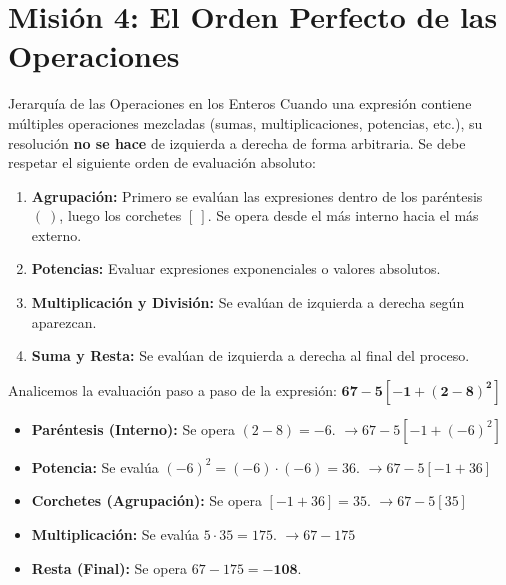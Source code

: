 \documentclass[12pt, letterpaper]{article}
\begin{document}
	\section*{Misión 4: El Orden Perfecto de las Operaciones}
	
	\begin{concepto}{Jerarquía de las Operaciones en los Enteros}
		Cuando una expresión contiene múltiples operaciones mezcladas (sumas, multiplicaciones, potencias, etc.), su resolución \textbf{no se hace} de izquierda a derecha de forma arbitraria. Se debe respetar el siguiente orden de evaluación absoluto:
		
		\begin{enumerate}
			\item \textbf{Agrupación:} Primero se evalúan las expresiones dentro de los paréntesis $( \ )$, luego los corchetes $[ \ ]$. Se opera desde el más interno hacia el más externo.
			\item \textbf{Potencias:} Evaluar expresiones exponenciales o valores absolutos.
			\item \textbf{Multiplicación y División:} Se evalúan de izquierda a derecha según aparezcan.
			\item \textbf{Suma y Resta:} Se evalúan de izquierda a derecha al final del proceso.
		\end{enumerate}
	\end{concepto}
	
	\begin{ejemplo}
		Analicemos la evaluación paso a paso de la expresión: $\mathbf{67 - 5[-1 + (2 - 8)^2]}$
		\begin{itemize}
			\item \textbf{Paréntesis (Interno):} Se opera $(2 - 8) = -6$. \quad $\rightarrow 67 - 5[-1 + (-6)^2]$
			\item \textbf{Potencia:} Se evalúa $(-6)^2 = (-6) \cdot (-6) = 36$. \quad $\rightarrow 67 - 5[-1 + 36]$
			\item \textbf{Corchetes (Agrupación):} Se opera $[-1 + 36] = 35$. \quad $\rightarrow 67 - 5[35]$
			\item \textbf{Multiplicación:} Se evalúa $5 \cdot 35 = 175$. \quad $\rightarrow 67 - 175$
			\item \textbf{Resta (Final):} Se opera $67 - 175 = \mathbf{-108}$.
		\end{itemize}
	\end{ejemplo}
	
\end{document}
